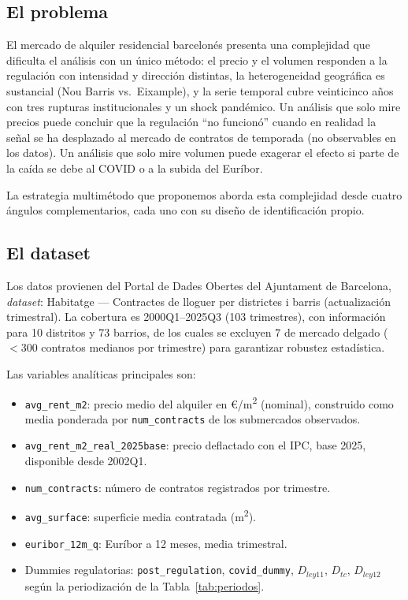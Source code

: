 \documentclass[12pt,a4paper]{article}
\begin{document}
\subsection{El problema}

El mercado de alquiler residencial barcelonés presenta una complejidad que dificulta
el análisis con un único método: el precio y el volumen responden a la regulación con
intensidad y dirección distintas, la heterogeneidad geográfica es sustancial (Nou
Barris vs.\ Eixample), y la serie temporal cubre veinticinco años con tres rupturas
institucionales y un shock pandémico. Un análisis que solo mire precios puede
concluir que la regulación ``no funcionó'' cuando en realidad la señal se ha
desplazado al mercado de contratos de temporada (no observables en los datos). Un
análisis que solo mire volumen puede exagerar el efecto si parte de la caída se debe
al COVID o a la subida del Euríbor.

La estrategia multimétodo que proponemos aborda esta complejidad desde cuatro ángulos
complementarios, cada uno con su diseño de identificación propio.

\subsection{El dataset}

Los datos provienen del Portal de Dades Obertes del Ajuntament de Barcelona,
\textit{dataset}: Habitatge --- Contractes de lloguer per districtes i barris (actualización
trimestral). La cobertura es 2000Q1--2025Q3 (103 trimestres), con información para
10 distritos y 73 barrios, de los cuales se excluyen 7 de mercado delgado
($< 300$ contratos medianos por trimestre) para garantizar robustez estadística.

Las variables analíticas principales son:
\begin{itemize}[leftmargin=*, itemsep=2pt]
  \item \texttt{avg\_rent\_m2}: precio medio del alquiler en \euro/m\textsuperscript{2}
    (nominal), construido como media ponderada por \texttt{num\_contracts} de los
    submercados observados.
  \item \texttt{avg\_rent\_m2\_real\_2025base}: precio deflactado con el IPC,
    base 2025, disponible desde 2002Q1.
  \item \texttt{num\_contracts}: número de contratos registrados por trimestre.
  \item \texttt{avg\_surface}: superficie media contratada (m\textsuperscript{2}).
  \item \texttt{euribor\_12m\_q}: Euríbor a 12 meses, media trimestral.
  \item Dummies regulatorias: \texttt{post\_regulation}, \texttt{covid\_dummy},
    $D_{ley11}$, $D_{tc}$, $D_{ley12}$ según la periodización de la
    Tabla~\ref{tab:periodos}.
\end{itemize}
\end{document}
